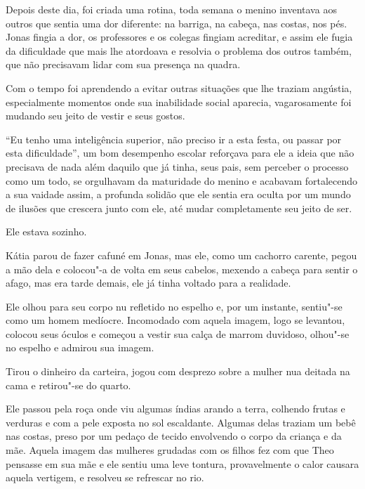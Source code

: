 Depois deste dia, foi criada uma rotina, toda semana o menino inventava
aos outros que sentia uma dor diferente: na barriga, na cabeça, nas
costas, nos pés. Jonas fingia a dor, os professores e os colegas fingiam
acreditar, e assim ele fugia da dificuldade que mais lhe atordoava e
resolvia o problema dos outros também, que não precisavam lidar com sua
presença na quadra.

Com o tempo foi aprendendo a evitar outras situações que lhe traziam
angústia, especialmente momentos onde sua inabilidade social aparecia,
vagarosamente foi mudando seu jeito de vestir e seus gostos.

``Eu tenho uma inteligência superior, não preciso ir a esta festa, ou
passar por esta dificuldade'', um bom desempenho escolar reforçava para
ele a ideia que não precisava de nada além daquilo que já tinha, seus
pais, sem perceber o processo como um todo, se orgulhavam da maturidade
do menino e acabavam fortalecendo a sua vaidade assim, a profunda
solidão que ele sentia era oculta por um mundo de ilusões que crescera
junto com ele, até mudar completamente seu jeito de ser.

Ele estava sozinho.

\asterisc

Kátia parou de fazer cafuné em Jonas, mas ele, como um cachorro carente,
pegou a mão dela e colocou"-a de volta em seus cabelos, mexendo a cabeça
para sentir o afago, mas era tarde demais, ele já tinha voltado para a
realidade.

Ele olhou para seu corpo nu refletido no espelho e, por um instante,
sentiu"-se como um homem medíocre. Incomodado com aquela imagem, logo se
levantou, colocou seus óculos e começou a vestir sua calça de marrom
duvidoso, olhou"-se no espelho e admirou sua imagem.

Tirou o dinheiro da carteira, jogou com desprezo sobre a mulher nua
deitada na cama e retirou"-se do quarto.

\asterisc


Ele passou pela roça onde viu algumas índias arando a terra, colhendo
frutas e verduras e com a pele exposta no sol escaldante. Algumas delas
traziam um bebê nas costas, preso por um pedaço de tecido envolvendo o
corpo da criança e da mãe. Aquela imagem das mulheres grudadas com os
filhos fez com que Theo pensasse em sua mãe e ele sentiu uma leve
tontura, provavelmente o calor causara aquela vertigem, e resolveu se
refrescar no rio.


